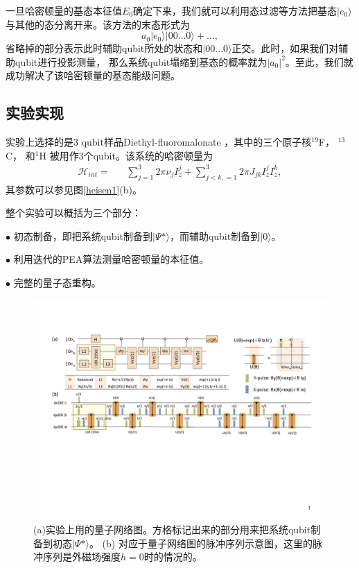 一旦哈密顿量的基态本征值$E_0$确定下来，我们就可以利用态过滤\cite{heisen5}等方法把基态$|e_0\rangle $
与其他的态分离开来。该方法的末态形式为
\begin{equation}
a_0 |e_0\rangle |00\ldots 0\rangle + \ldots,
\end{equation}
省略掉的部分表示此时辅助qubit所处的状态和$|00\ldots 0\rangle$正交。此时，如果我们对辅助qubit进行投影测量，
那么系统qubit塌缩到基态的概率就为$|a_0|^2$。至此，我们就成功解决了该哈密顿量的基态能级问题。

\subsection{实验实现}

实验上选择的是3 qubit样品Diethyl-fluoromalonate ，其中的三个原子核$^{19}$F， $^{13}$C， 和$^1$H
被用作3个qubit。该系统的哈密顿量为
\begin{eqnarray}
\mathcal{H}_{int}=&&\sum\limits_{j=1}^3 {2\pi \nu _j } I_z^j  + \sum\limits_{j < k,=1}^3 {2\pi} J_{jk} I_z^j I_z^k,
\end{eqnarray}
其参数可以参见图\ref{heisen1}(b)。

整个实验可以概括为三个部分：

$\bullet$ 初态制备，即把系统qubit制备到$|\Psi\ast\rangle$，而辅助qubit制备到$|0\rangle$。

$\bullet$ 利用迭代的PEA算法测量哈密顿量的本征值。

$\bullet$ 完整的量子态重构。



 \begin{figure}[htbp]
            \begin{center}
              \includegraphics[width= 0.8\columnwidth]{figures/heisen2.pdf}
              \caption{(a)实验上用的量子网络图。方格标记出来的部分用来把系统qubit制备到初态$|\Psi\ast\rangle$。
              (b) 对应于量子网络图的脉冲序列示意图，这里的脉冲序列是外磁场强度$h=0$时的情况的。}\label{heisen2}
            \end{center}
 \end{figure}

